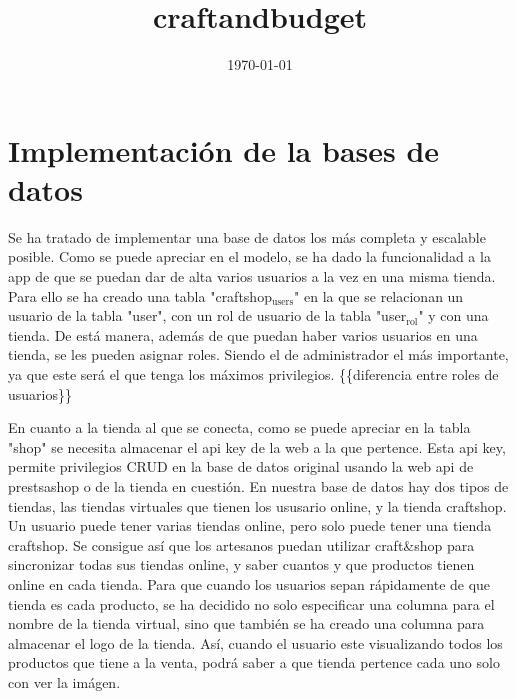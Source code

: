\documentclass[11pt]{article}
\date{\today}
\title{craftandbudget}
\begin{document}
\maketitle
\tableofcontents

\section{Implementación de la bases de datos}
\label{sec-1}
Se ha tratado de implementar una base de datos los más completa y
escalable posible. Como se puede apreciar en el modelo, se ha dado
la funcionalidad a la app de que se puedan dar de alta varios
usuarios a la vez en una misma tienda. Para ello se ha creado una
tabla "craftshop$_{\text{users}}$" en la que se relacionan un usuario de la
tabla "user", con un rol de usuario de la tabla "user$_{\text{rol}}$" y con una
tienda. De está manera, además de que puedan haber varios usuarios
en una tienda, se les pueden asignar roles. Siendo el de
administrador el más importante, ya que este será el que tenga los
máximos privilegios. \{\{diferencia entre roles de usuarios\}\}

En cuanto a la tienda al que se conecta, como se puede apreciar en
la tabla "shop" se necesita almacenar el api key de la web a la que
pertence. Esta api key, permite privilegios CRUD en la base de datos
original usando la web api de prestsashop o de la tienda en
cuestión. En nuestra base de datos hay dos tipos de tiendas, las
tiendas virtuales que tienen los ususario online, y la tienda
craftshop. Un usuario puede tener varias tiendas online, pero solo
puede tener una tienda craftshop. Se consigue así que los artesanos
puedan utilizar craft\&shop para sincronizar todas sus tiendas
online, y saber cuantos y que productos tienen online en cada
tienda. Para que cuando los usuarios sepan rápidamente de que tienda
es cada producto, se ha decidido no solo especificar una columna
para el nombre de la tienda virtual, sino que también se ha creado
una columna para almacenar el logo de la tienda. Así, cuando el
usuario este visualizando todos los productos que tiene a la venta,
podrá saber a que tienda pertence cada uno solo con ver la imágen.
\end{document}
